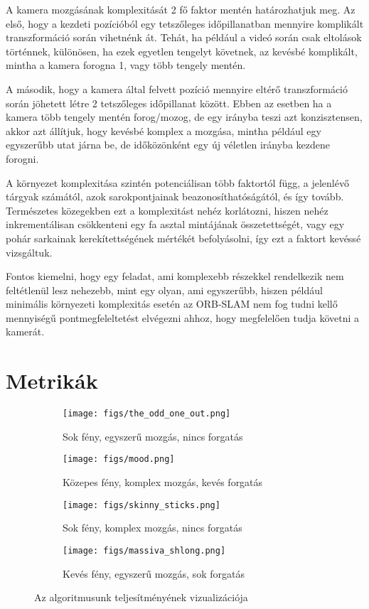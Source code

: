 A kamera mozgásának komplexitását 2 fő faktor mentén határozhatjuk meg.
Az első, hogy a kezdeti pozícióból egy tetszőleges időpillanatban mennyire komplikált transzformáció során vihetnénk át.
Tehát, ha például a videó során csak eltolások történnek, különösen, ha ezek egyetlen tengelyt követnek, az kevésbé komplikált, mintha a kamera forogna 1, vagy több tengely mentén.

A második, hogy a kamera által felvett pozíció mennyire eltérő transzformáció során jöhetett létre 2 tetszőleges időpillanat között.
Ebben az esetben ha a kamera több tengely mentén forog/mozog, de egy irányba teszi azt konzisztensen, akkor azt állítjuk, hogy kevésbé komplex a mozgása, mintha például egy egyszerűbb utat járna be, de időközönként egy új véletlen irányba kezdene forogni.

A környezet komplexitása szintén potenciálisan több faktortól függ, a jelenlévő tárgyak számától, azok sarokpontjainak beazonosíthatóságától, és így tovább.
Természetes közegekben ezt a komplexitást nehéz korlátozni, hiszen nehéz inkrementálisan csökkenteni egy fa asztal mintájának összetettségét, vagy egy pohár sarkainak kerekítettségének mértékét befolyásolni, így ezt a faktort kevéssé vizsgáltuk.

Fontos kiemelni, hogy egy feladat, ami komplexebb részekkel rendelkezik nem feltétlenül lesz nehezebb, mint egy olyan, ami egyszerűbb, hiszen például minimális környezeti komplexitás esetén az ORB-SLAM nem fog tudni kellő mennyiségű pontmegfeleltetést elvégezni ahhoz, hogy megfelelően tudja követni a kamerát.

\section{Metrikák}

\begin{figure*}
	\centering
	\begin{subfigure}[b]{0.49\textwidth}
		\centering
		\texttt{[image: figs/the\_odd\_one\_out.png]}
		\caption{Sok fény, egyszerű mozgás, nincs forgatás}
		\label{fig:odd}
	\end{subfigure}
	\hfill
	\begin{subfigure}[b]{0.5\textwidth}
		\centering
		\texttt{[image: figs/mood.png]}
		\caption{Közepes fény, komplex mozgás, kevés forgatás}
		\label{fig:mood}
	\end{subfigure}
	\hfill
	\begin{subfigure}[b]{0.49\textwidth}
		\centering
		\texttt{[image: figs/skinny\_sticks.png]}
		\caption{Sok fény, komplex mozgás, nincs forgatás}
		\label{fig:skinny}
	\end{subfigure}
	\begin{subfigure}[b]{0.5\textwidth}
		\centering
		\texttt{[image: figs/massiva\_shlong.png]}
		\caption{Kevés fény, egyszerű mozgás, sok forgatás}
		\label{fig:italian}
	\end{subfigure}
	\caption{Az algoritmusunk teljesítményének vizualizációja}
	\label{fig:bars}
\end{figure*}

